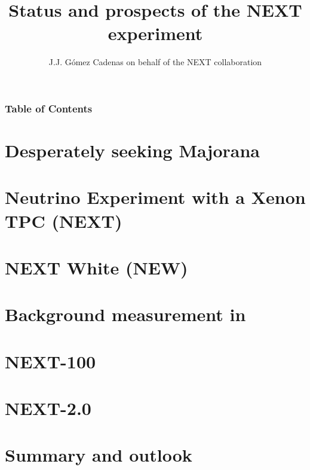 \documentclass[9pt]{beamer}
\title{Status and prospects of the NEXT experiment}
\author{J.J. G\'omez Cadenas on behalf of the NEXT collaboration}
\institute{Donostia International Physics Center (DIPC)} %
\date[March, 19, 2019] %
\begin{document}
\frame{\titlepage}


\begin{frame}
\frametitle{Table of Contents}
\tableofcontents
\end{frame}



\section{Desperately seeking Majorana}

\section{Neutrino Experiment with a Xenon TPC (NEXT)}

\section{NEXT White (NEW)}

\section{Background measurement in \NEW}
 

\section{NEXT-100}
 

\section{NEXT-2.0}
 
 

\section{Summary and outlook}
\end{document}
